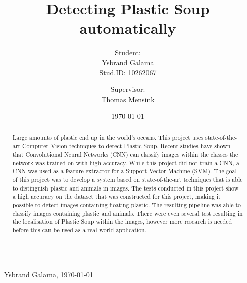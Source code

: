 \documentclass[a4paper, 11pt]{article}
\title{Detecting Plastic Soup automatically}
\author{Student:\\Ysbrand Galama \\ Stud.ID: 10262067 \and Supervisor:\\ Thomas Mensink }
\date{\today}
\begin{document}

\ifx\showintro\undefined

\thispagestyle{empty}
$\,$
\vfill
\begin{abstract}
Large amounts of plastic end up in the world's oceans.
This project uses state-of-the-art Computer Vision techniques to detect Plastic Soup.
Recent studies have shown that Convolutional Neural Networks (CNN) can classify images within the classes the network was trained on with high accuracy.
While this project did not train a CNN, a CNN was used as a feature extractor for a Support Vector Machine (SVM).
The goal of this project was to develop a system based on state-of-the-art techniques that is able to distinguish plastic and animals in images.
The tests conducted in this project show a high accuracy on the dataset that was constructed for this project, making it possible to detect images containing floating plastic.
The resulting pipeline was able to classify images containing plastic and animals.
There were even several test resulting in the localisation of Plastic Soup within the images, however more research is needed before this can be used as a real-world application.
\end{abstract}
\vfill
\vfill
$\,$
\newpage
\tableofcontents
\newpage
\else
{}\\ \mbox{}~\hfill{Ysbrand Galama, \today}
\fi




\ifx\showpbreak\undefined \clearpage \fi


\ifx\showpbreak\undefined \clearpage \fi


\ifx\showpbreak\undefined \newpage \fi







\end{document}
